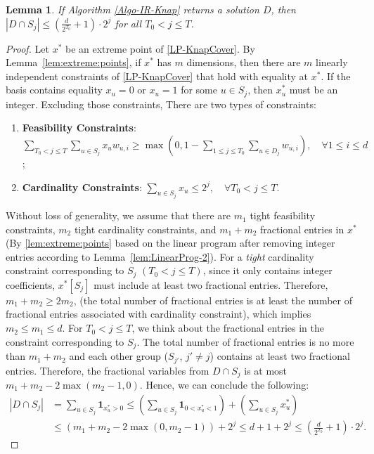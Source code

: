 \documentclass[11pt,a4paper]{article} \usepackage{enumitem}
\newcommand{\assigned}[1]{[ #1 ]}
\newtheorem{lemma}[theorem]{Lemma}
\theoremstyle{definition}
\begin{document}
\begin{lemma} \label{lem:Knap-3}
If Algorithm \ref{Algo-IR-Knap} returns a solution $D$, then $|D \cap S_j| \le \left( \frac{d}{2^{T_0}}+1\right)\cdot 2^{j}$ for all $T_0 < j \le T$.
\end{lemma}
\begin{proof}

Let $x^{*}$ be an extreme point 
of \cref{LP-KnapCover}. 
By Lemma~\ref{lem:extreme:points}, if $x^*$ has $m$ dimensions, then there are $m$ linearly independent constraints of \ref{LP-KnapCover} that hold with equality at $x^*$.
If the basis contains equality $x_u = 0$ or $x_u = 1$ for some $u \in S_j$, then $x^{*}_u$ must be an integer. 
Excluding those constraints, There are two types of constraints:

\begin{enumerate}
    \item  \textbf{Feasibility Constraints}: $\sum_{T_0 < j \leq T} \sum_{u \in S_j} x_u w_{u,i} \geq \max\left(0,1-\sum_{1\le j\le T_0} \sum_{u\in D_j} w_{u,i}\right), \quad  \forall 1 \leq i \leq d$;
    \item  \textbf{Cardinality Constraints}: $\sum_{u \in S_j} x_u \leq 2^j, \quad \forall T_0 < j \leq T$.
\end{enumerate}


Without loss of generality, we assume that there are $m_1$ tight feasibility constraints, $m_2$ tight cardinality constraints, and $m_1+m_2$ fractional entries in $x^{*}$
(By \cref{lem:extreme:points} based on the linear program after removing integer entries according to Lemma~\ref{lem:LinearProg-2}). For a {\em tight} cardinality constraint corresponding to $S_j \,\,(T_0<j\leq T)$, since it only contains integer coefficients, $x^{*}\assigned{S_j}$ must include at least two fractional entries. Therefore, $m_1+m_2\ge 2m_2$,
(the total number of fractional entries is at least 
the number of fractional entries associated with cardinality constraint),
which implies $m_2\le m_1\le d$. For $T_0< j\leq T$, we think about the fractional entries in the constraint corresponding to $S_j$. The total number of fractional entries is no more than $m_1+m_2$ and each other group ($S_{j'}$, $j'\ne j$) contains at least two fractional entries. Therefore, the fractional variables from $D\cap S_j$ is at most $m_1+m_2-2\max(m_2-1,0)$.
Hence, we can conclude the following:
\begin{align*}
|D \cap S_j| &= \sum_{u \in S_j} \mathbf{1}_{x^{*}_u > 0} \le \left( \sum_{u \in S_j} \mathbf{1}_{0 < x^{*}_u < 1} \right) + \left( \sum_{u \in S_j} x^{*}_u \right) \\
& \le \left( m_1+m_2-2\max(0,m_2-1)\right) + 2^j \le d+1+2^{j}\le \left( \frac{d}{2^{T_0}}+1\right)\cdot 2^j.
\end{align*}
\end{proof}
\end{document}
